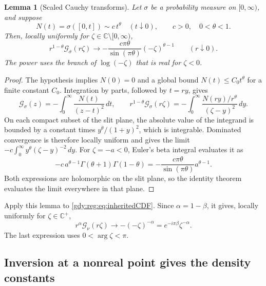 \documentclass[11pt]{article}
\numberwithin{equation}{section}
\newtheorem{lemma}[theorem]{Lemma}
\theoremstyle{definition}
\theoremstyle{remark}
\begin{document}
\begin{lemma}[Scaled Cauchy transforms]\label{gdy:reg:lem:abelian}
Let $\sigma$ be a probability measure on $[0,\infty)$, and suppose
\[
 N(t)=\sigma([0,t])\sim c\,t^\theta\quad(t\downarrow0),
 \qquad c>0,\quad 0<\theta<1.
\]
Then, locally uniformly for
$\zeta\in\mathbb C\setminus[0,\infty)$,
\begin{equation}\label{gdy:reg:eq:abelian}
 r^{1-\theta}\mathcal G_\sigma(r\zeta)
 \longrightarrow
 -\frac{c\pi\theta}{\sin(\pi\theta)}(-\zeta)^{\theta-1}
 \qquad(r\downarrow0).
\end{equation}
The power uses the branch of $\log(-\zeta)$ that is real for
$\zeta<0$.
\end{lemma}
\begin{proof}
The hypothesis implies $N(0)=0$ and a global bound
$N(t)\le C_0t^\theta$ for a finite constant $C_0$.
Integration by parts, followed by $t=ry$, gives
\[
 \mathcal G_\sigma(z)
 =-\int_0^\infty\frac{N(t)}{(z-t)^2}\,dt,
 \qquad
 r^{1-\theta}\mathcal G_\sigma(r\zeta)
 =-\int_0^\infty
       \frac{N(ry)/r^\theta}{(\zeta-y)^2}\,dy.
\]
On each compact subset of the slit plane, the absolute value of the
integrand is bounded by a constant times
$y^\theta/(1+y)^2$, which is integrable.  Dominated convergence is
therefore locally uniform and gives the limit
$-c\int_0^\infty y^\theta(\zeta-y)^{-2}\,dy$.
For $\zeta=-a<0$, Euler's beta integral evaluates it as
\[
 -c\,a^{\theta-1}
    \Gamma(\theta+1)\Gamma(1-\theta)
 =-\frac{c\pi\theta}{\sin(\pi\theta)}a^{\theta-1}.
\]
Both expressions are holomorphic on the slit plane, so the identity
theorem evaluates the limit everywhere in that plane.
\end{proof}

Apply this lemma to \eqref{gdy:reg:eq:inheritedCDF}.  Since
$\alpha=1-\beta$, it gives, locally uniformly for $\zeta\in\mathbb C^+$,
\begin{equation}\label{gdy:reg:eq:nscaled}
 r^\alpha\mathcal G_\nu(r\zeta)
 \longrightarrow-(-\zeta)^{-\alpha}
 =e^{-i\pi\beta}\zeta^{-\alpha}.
\end{equation}
The last expression uses $0<\arg\zeta<\pi$.

\subsection{Inversion at a nonreal point gives the density constants}
\label{gdy:reg:subsec:endpoint}
\end{document}
